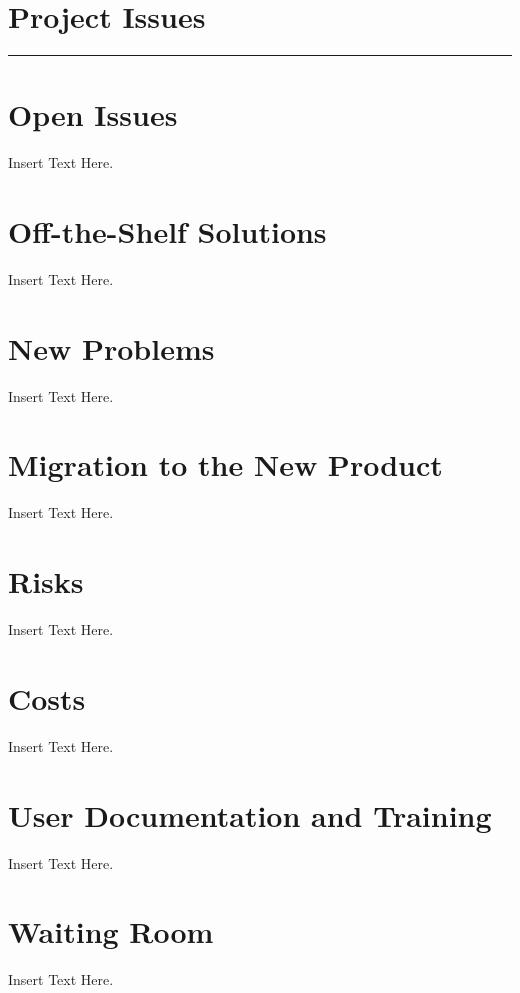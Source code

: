 \documentclass [12pt]{article}
\begin{document}

\section *{\Large Project Issues\vspace*{-6mm}}\rule{6.5in}{.1em} 

\section{Open Issues}
	Insert Text Here.

\section{Off-the-Shelf Solutions}
	Insert Text Here.

\section{New Problems}
	Insert Text Here.

\section{Migration to the New Product} 
	Insert Text Here.

\section{Risks}
	Insert Text Here.
	
\section{Costs}	
	Insert Text Here.

\section{User Documentation and Training}
	Insert Text Here.

\section{Waiting Room}
	Insert Text Here. 
\end{document}
